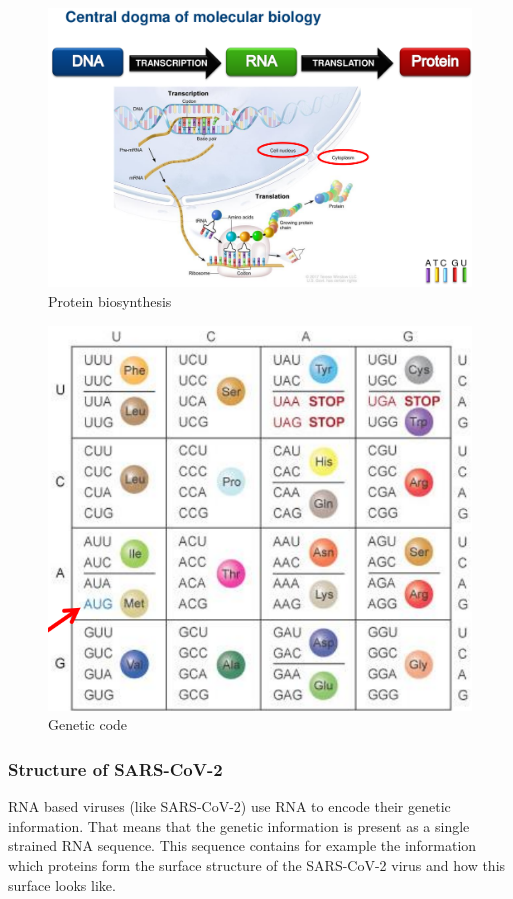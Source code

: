 \begin{figure}[ht!]
	\centering
	\includegraphics[width=1.0\linewidth]{figures/dogmaMolecularBiology.png}
	\caption{Protein biosynthesis \cite{schererStatisticalGeneticsGenetic2021}}
	\label{protein_biosynthesis}
\end{figure}

\begin{figure}[ht!]
	\centering
	\includegraphics[width=0.4\linewidth]{figures/geneticCode.png}
	\caption{Genetic code \cite{schererStatisticalGeneticsGenetic2021}}
	\label{genetic_code}
\end{figure}


\subsubsection{Structure of \ac{SARS-CoV-2}} \label{fundamentalsA0c}

\ac{RNA} based viruses (like \ac{SARS-CoV-2}) use \ac{RNA} to encode their genetic information. That means that the genetic information is present as a single strained \ac{RNA} sequence. This sequence contains for example the information which proteins form the surface structure of the SARS-CoV-2 virus and how this surface looks like. \cite{NAQVI2020165878}

